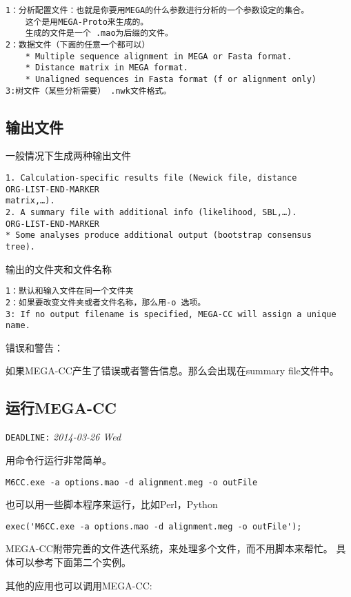 \documentclass[11pt]{ctexart}
\begin{document}
\begin{verbatim}
1：分析配置文件：也就是你要用MEGA的什么参数进行分析的一个参数设定的集合。
    这个是用MEGA-Proto来生成的。
    生成的文件是一个 .mao为后缀的文件。
2：数据文件（下面的任意一个都可以）
    * Multiple sequence alignment in MEGA or Fasta format. 
    * Distance matrix in MEGA format. 
    * Unaligned sequences in Fasta format (f or alignment only)
3:树文件（某些分析需要） .nwk文件格式。
\end{verbatim}
\subsection{输出文件}
\label{sec-3-3}

一般情况下生成两种输出文件


\begin{verbatim}
1. Calculation-specific results file (Newick file, distance 
ORG-LIST-END-MARKER
matrix,…). 
2. A summary file with additional info (likelihood, SBL,…). 
ORG-LIST-END-MARKER
* Some analyses produce additional output (bootstrap consensus 
tree).
\end{verbatim}
输出的文件夹和文件名称


\begin{verbatim}
1：默认和输入文件在同一个文件夹
2：如果要改变文件夹或者文件名称，那么用-o 选项。
3: If no output filename is specified, MEGA-CC will assign a unique 
name.
\end{verbatim}
错误和警告：

如果MEGA-CC产生了错误或者警告信息。那么会出现在summary file文件中。
\subsection{运行MEGA-CC}
\label{sec-3-4}

   \texttt{DEADLINE:} \textit{2014-03-26 Wed}

用命令行运行非常简单。

\begin{verbatim}
M6CC.exe -a options.mao -d alignment.meg -o outFile
\end{verbatim}
也可以用一些脚本程序来运行，比如Perl，Python

\begin{verbatim}
exec('M6CC.exe -a options.mao -d alignment.meg -o outFile');
\end{verbatim}
MEGA-CC附带完善的文件迭代系统，来处理多个文件，而不用脚本来帮忙。
具体可以参考下面第二个实例。

其他的应用也可以调用MEGA-CC:
\end{document}
